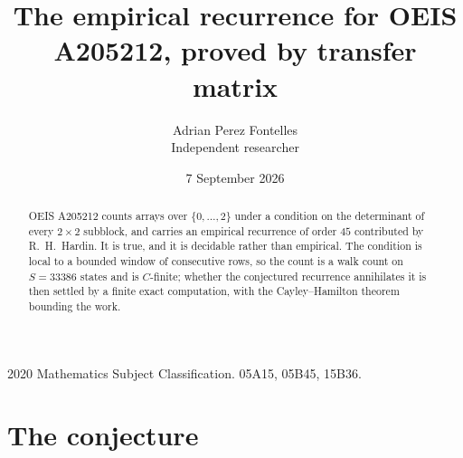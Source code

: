 \documentclass[11pt,a4paper]{article}
\title{The empirical recurrence for OEIS A205212, proved by transfer matrix}
\author{Adrian Perez Fontelles\\ \small Independent researcher}
\date{7 September 2026}
\theoremstyle{plain}
\theoremstyle{definition}
\begin{document}
\maketitle

\begin{abstract}
OEIS A205212 counts arrays over $\{0,\dots,2\}$ under a condition on the determinant of every
$2\times2$ subblock, and carries an empirical recurrence of order $45$ contributed by
R.~H.~Hardin. It is true, and it is decidable rather than empirical. The condition is local to
a bounded window of consecutive rows, so the count is a walk count on $S=33386$ states and is
$C$-finite; whether the conjectured recurrence annihilates it is then settled by a finite exact
computation, with the Cayley--Hamilton theorem bounding the work.
\end{abstract}

\noindent\small 2020 Mathematics Subject Classification. 05A15, 05B45, 15B36.\normalsize

\section{The conjecture}
\end{document}
